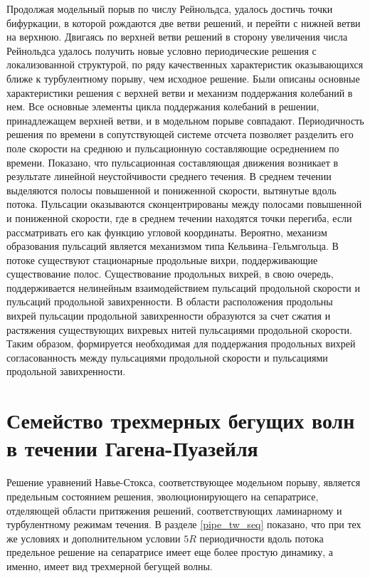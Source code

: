 Продолжая модельный порыв по числу Рейнольдса, удалось достичь точки бифуркации, в которой рождаются две ветви решений, и перейти с нижней ветви на верхнюю. Двигаясь по верхней ветви решений в сторону увеличения числа Рейнольдса удалось получить новые условно периодические решения с локализованной структурой, по ряду качественных характеристик оказывающихся ближе к турбулентному порыву, чем исходное решение. Были описаны основные характеристики решения с верхней ветви и механизм поддержания колебаний в нем. Все основные элементы цикла поддержания колебаний в решении, принадлежащем верхней ветви, и в модельном порыве совпадают. Периодичность решения по времени в сопутствующей системе отсчета позволяет разделить его поле скорости на среднюю и пульсационную составляющие осреднением по времени. Показано, что пульсационная составляющая движения возникает в результате линейной неустойчивости среднего течения. В среднем течении выделяются полосы повышенной и пониженной скорости, вытянутые вдоль потока. Пульсации оказываются сконцентрированы между полосами повышенной и пониженной скорости, где в среднем течении находятся точки перегиба, если рассматривать его как функцию угловой координаты. Вероятно, механизм образования пульсаций является механизмом типа Кельвина--Гельмгольца. В потоке существуют стационарные продольные вихри, поддерживающие существование полос. Существование продольных вихрей, в свою очередь, поддерживается нелинейным взаимодействием пульсаций продольной скорости и пульсаций продольной завихренности. В области расположения продольны вихрей пульсации продольной завихренности образуются за счет сжатия и растяжения существующих вихревых нитей пульсациями продольной скорости. Таким образом, формируется необходимая для поддержания продольных вихрей согласованность между пульсациями продольной скорости и пульсациями продольной завихренности. 

\section{Семейство трехмерных бегущих волн в течении Гагена-Пуазейля}

Решение уравнений Навье-Стокса, соответствующее модельном порыву, является предельным состоянием решения, эволюционирующего на сепаратрисе, отделяющей области притяжения решений, соответствующих ламинарному и турбулентному режимам течения. В разделе \ref{pipe_tw_seq} показано, что при тех же условиях и дополнительном условии $5R$ периодичности вдоль потока предельное решение на сепаратрисе имеет еще более простую динамику, а именно, имеет вид трехмерной бегущей волны. 


